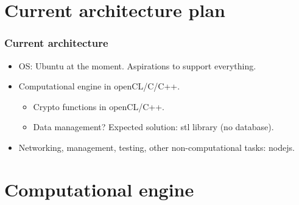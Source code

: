 \section{Current architecture plan}
\begin{frame}
\frametitle{Current architecture}
\begin{itemize}
\item OS: Ubuntu at the moment. Aspirations to support everything.
\item<2-> Computational engine in openCL/C/C++.
\begin{itemize}
\item<3-> Crypto functions in openCL/C++.
\item<4-> Data management? Expected solution: stl library (no database).
\end{itemize}
\item<5-> Networking, management, testing, other non-computational tasks: nodejs.
\end{itemize}
\end{frame}
\section{Computational engine}
